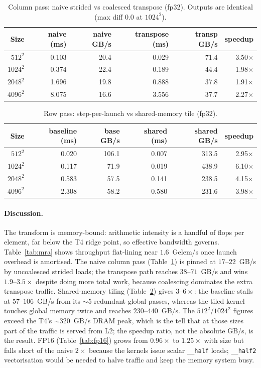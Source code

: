 \documentclass[11pt]{article}
\newcommand{\code}[1]{\texttt{#1}}
\begin{document}
\begin{table}[h]
\centering\small
\begin{tabular}{@{}rrrrrr@{}}
\toprule
Size & naive (ms) & naive GB/s & transpose (ms) & transp GB/s & speedup \\
\midrule
$512^2$  & 0.103 & 20.4 & 0.029 & 71.4 & 3.50$\times$ \\
$1024^2$ & 0.374 & 22.4 & 0.189 & 44.4 & 1.98$\times$ \\
$2048^2$ & 1.696 & 19.8 & 0.888 & 37.8 & 1.91$\times$ \\
$4096^2$ & 8.075 & 16.6 & 3.556 & 37.7 & 2.27$\times$ \\
\bottomrule
\end{tabular}
\caption{Column pass: naive strided vs coalesced transpose (fp32). Outputs are
identical (max diff $0.0$ at $1024^2$).}
\label{tab:col}
\end{table}

\begin{table}[h]
\centering\small
\begin{tabular}{@{}rrrrrr@{}}
\toprule
Size & baseline (ms) & base GB/s & shared (ms) & shared GB/s & speedup \\
\midrule
$512^2$  & 0.020 & 106.1 & 0.007 & 313.5 & 2.95$\times$ \\
$1024^2$ & 0.117 & 71.9  & 0.019 & 438.9 & 6.10$\times$ \\
$2048^2$ & 0.583 & 57.5  & 0.141 & 238.5 & 4.15$\times$ \\
$4096^2$ & 2.308 & 58.2  & 0.580 & 231.6 & 3.98$\times$ \\
\bottomrule
\end{tabular}
\caption{Row pass: step-per-launch vs shared-memory tile (fp32).}
\label{tab:tiled}
\end{table}

\paragraph{Discussion.}
The transform is memory-bound: arithmetic intensity is a handful of flops per
element, far below the T4 ridge point, so effective bandwidth governs.
Table~\ref{tab:mra} shows throughput flat-lining near $1.6$~Gelem/s once launch
overhead is amortised. The naive column pass (Table~\ref{tab:col}) is pinned at
$17$--$22$~GB/s by uncoalesced strided loads; the transpose path reaches
$38$--$71$~GB/s and wins $1.9$--$3.5\times$ despite doing more total work, because
coalescing dominates the extra transpose traffic. Shared-memory tiling
(Table~\ref{tab:tiled}) gives $3$--$6\times$: the baseline stalls at $57$--$106$~GB/s
from its $\sim$5 redundant global passes, whereas the tiled kernel touches global
memory twice and reaches $230$--$440$~GB/s. The $512^2$/$1024^2$ figures exceed the
T4's $\sim$320~GB/s DRAM peak, which is the tell that at those sizes part of the
traffic is served from L2; the speedup ratio, not the absolute GB/s, is the result.
FP16 (Table~\ref{tab:fp16}) grows from $0.96\times$ to $1.25\times$ with size but
falls short of the naive $2\times$ because the kernels issue scalar \code{\_\_half}
loads; \code{\_\_half2} vectorisation would be needed to halve traffic and keep the
memory system busy.
\end{document}

